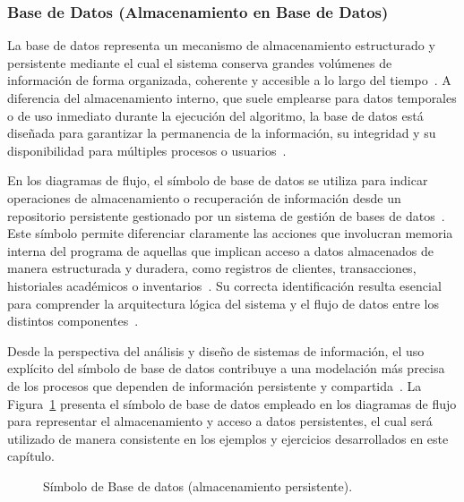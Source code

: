 \documentclass[12pt,twoside]{book}
\begin{document}
					\subsubsection{Base de Datos (Almacenamiento en Base de Datos)}
					\noindent
						La base de datos representa un mecanismo de almacenamiento estructurado y persistente mediante el cual el sistema conserva grandes volúmenes de información de forma organizada, coherente y accesible a lo largo del tiempo~\cite{Elmasri2016Database,Silberschatz2020Database}. A diferencia del almacenamiento interno, que suele emplearse para datos temporales o de uso inmediato durante la ejecución del algoritmo, la base de datos está diseñada para garantizar la permanencia de la información, su integridad y su disponibilidad para múltiples procesos o usuarios~\cite{Elmasri2016Database,Date2019Database}.
						
						En los diagramas de flujo, el símbolo de base de datos se utiliza para indicar operaciones de almacenamiento o recuperación de información desde un repositorio persistente gestionado por un sistema de gestión de bases de datos~\cite{Kendall2014Systems,SmartDrawFlowchartSymbols}. Este símbolo permite diferenciar claramente las acciones que involucran memoria interna del programa de aquellas que implican acceso a datos almacenados de manera estructurada y duradera, como registros de clientes, transacciones, historiales académicos o inventarios~\cite{Elmasri2016Database,Silberschatz2020Database}. Su correcta identificación resulta esencial para comprender la arquitectura lógica del sistema y el flujo de datos entre los distintos componentes~\cite{Kendall2014Systems}.
						
						Desde la perspectiva del análisis y diseño de sistemas de información, el uso explícito del símbolo de base de datos contribuye a una modelación más precisa de los procesos que dependen de información persistente y compartida~\cite{Kendall2014Systems,Pressman2019Software}. La Figura~\ref{fig:DFBaseDatos} presenta el símbolo de base de datos empleado en los diagramas de flujo para representar el almacenamiento y acceso a datos persistentes, el cual será utilizado de manera consistente en los ejemplos y ejercicios desarrollados en este capítulo.
						
						\begin{figure}[h]
							\centering
							\caption{Símbolo de Base de datos (almacenamiento persistente).}
							\label{fig:DFBaseDatos}
						\end{figure}
				
\end{document}
